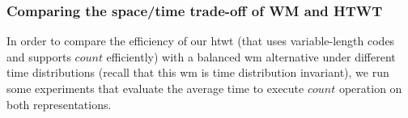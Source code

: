 



	\subsubsection{Comparing the space/time trade-off of WM and HTWT}
	\label{sec:time_exp}
	In order to compare the efficiency of our \gls{htwt} (that uses variable-length codes and supports $count$ efficiently)
	 with a balanced \gls{wm} alternative under 
	different time distributions (recall that this \gls{wm} is time distribution invariant), 
	we run some experiments that evaluate the average time to execute $count$ operation on
	both representations.

